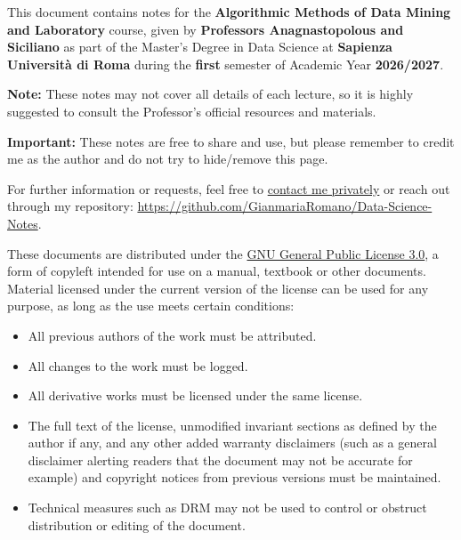 \documentclass{report}
\begin{document}
\begin{tcolorbox}[colback=gray!5!white, colframe=gray!75!black, title=Disclaimer]
    This document contains notes for the \textbf{Algorithmic Methods of Data Mining and Laboratory} course, given by \textbf{Professors Anagnastopolous and Siciliano} as part of the Master’s Degree in Data Science at \textbf{Sapienza Università di Roma} during the \textbf{first} semester of Academic Year \textbf{2026/2027}.
    
    \smallskip
    \textbf{Note: }These notes may not cover all details of each lecture, so it is highly suggested to consult the Professor's official resources and materials. 
    
    \smallskip
    \textbf{Important: }These notes are free to share and use, but please remember to credit me as the author and do not try to hide/remove this page.
\end{tcolorbox}

\begin{tcolorbox}[colback=gray!5!white, colframe=gray!75!black, title=Contacts]
    For further information or requests, feel free to \href{https://t.me/toritosenso}{contact me privately} or reach out through my repository: \href{https://github.com/GianmariaRomano/Data-Science-Notes}{https://github.com/GianmariaRomano/Data-Science-Notes}.
\end{tcolorbox}

\begin{tcolorbox}[colback=gray!5!white, colframe=gray!75!black, title=License]
    These documents are distributed under the \href{https://www.gnu.org/licenses/gpl-3.0.en.html}{GNU General Public License 3.0}, a form of copyleft intended for use on a manual, textbook or other documents. Material licensed under the current version of the license can be used for any purpose, as long as the use meets certain conditions:
    \begin{itemize}
        \item All previous authors of the work must be attributed.
        \item All changes to the work must be logged.
        \item All derivative works must be licensed under the same license.
        \item The full text of the license, unmodified invariant sections as defined by the author if any, and any other added warranty disclaimers (such as a general disclaimer alerting readers that the document may not be accurate for example) and copyright notices from previous versions must be maintained.
        \item Technical measures such as DRM may not be used to control or obstruct distribution or editing of the document.
    \end{itemize}
\end{tcolorbox}
\end{document}
